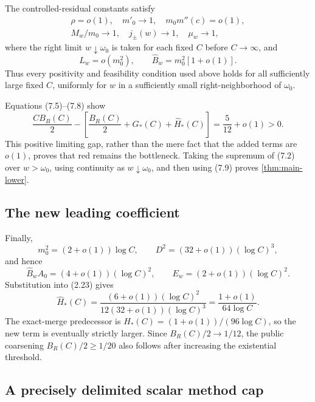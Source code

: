 The controlled-residual constants satisfy
\[
\begin{gathered}
 \rho=o(1),\quad m'_0\to1,\quad m_0m''(c)=o(1),\\
 M_w/m_0\to1,\quad j_\pm(w)\to1,\quad\mu_w\to1,
\end{gathered}
\tag{7.7}
\]
where the right limit \(w\downarrow\omega_0\) is taken for each fixed \(C\)
before \(C\to\infty\), and
\[
 \widehat L_w=o(m_0^2),\qquad
 \widehat B_w=m_0^2[1+o(1)].
\tag{7.8}
\]
Thus every positivity and feasibility condition used above holds for all
sufficiently large fixed \(C\), uniformly for \(w\) in a sufficiently small
right-neighborhood of \(\omega_0\).

Equations (7.5)--(7.8) show
\[
\frac{CB_B(C)}2-
\left[\frac{B_R(C)}2+G_*(C)+\widehat H_*(C)\right]
=\frac5{12}+o(1)>0.
\tag{7.9}
\]
This positive limiting gap, rather than the mere fact that the added terms
are \(o(1)\), proves that red remains the bottleneck.  Taking the supremum
of (7.2) over \(w>\omega_0\), using continuity as
\(w\downarrow\omega_0\), and then using (7.9) proves
\cref{thm:main-lower}.

\subsection{The new leading coefficient}

Finally,
\[
 m_0^2=(2+o(1))\log C,\qquad
 D^2=(32+o(1))(\log C)^3,
\tag{7.10}
\]
and hence
\[
 \widehat B_wA_0=(4+o(1))(\log C)^2,\qquad
 E_w=(2+o(1))(\log C)^2.
\tag{7.11}
\]
Substitution into (2.23) gives
\[
 \widehat H_*(C)=
 \frac{(6+o(1))(\log C)^2}
 {12(32+o(1))(\log C)^3}
 =\frac{1+o(1)}{64\log C}.
\tag{7.12}
\]
The exact-merge predecessor is
\(H_*(C)=(1+o(1))/(96\log C)\), so the new term is eventually strictly
larger.  Since \(B_R(C)/2\to1/12\), the public coarsening
\(B_R(C)/2\ge1/20\) also follows after increasing the existential threshold.

\subsection{A precisely delimited scalar method cap}


